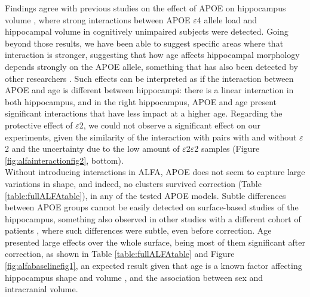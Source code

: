 Findings agree with previous studies on the effect of APOE on hippocampus volume \cite{Pievani2011,Mueller2009,Cacciaglia2018}, where strong interactions between APOE $\varepsilon$4 allele load and hippocampal volume in cognitively unimpaired subjects were detected. Going beyond those results, we have been able to suggest specific areas where that interaction is stronger, suggesting that how age affects hippocampal morphology depends strongly on the APOE allele, something that has also been detected by other researchers \cite{Shi2014}. Such effects can be interpreted as if the interaction between APOE and age is different between hippocampi: there is a linear interaction in both hippocampus, and in the right hippocampus, APOE and age present significant interactions that have less impact at a higher age. Regarding the protective effect of $\varepsilon$2, we could not observe a significant effect on our experiments, given the similarity of the interaction with pairs with and without $\varepsilon$2 and the uncertainty due to the low amount of $\varepsilon$2$\varepsilon$2 samples (Figure \ref{fig:alfainteractionfig2}, bottom). \\

Without introducing interactions in ALFA, APOE does not seem to capture large variations in shape, and indeed, no clusters survived correction (Table \ref{table:fullALFAtable}), in any of the tested APOE models. Subtle differences between APOE groups cannot be easily detected on surface-based studies of the hippocampus, something also observed in other studies with a different cohort of patients \cite{Dong2019}, where such differences were subtle, even before correction. Age presented large effects over the whole surface, being most of them significant after correction, as shown in Table \ref{table:fullALFAtable} and Figure \ref{fig:alfabaselinefig1}, an expected result given that age is a known factor affecting hippocampus shape and volume \cite{Lind2006}, and the association between sex and intracranial volume. \\ 

